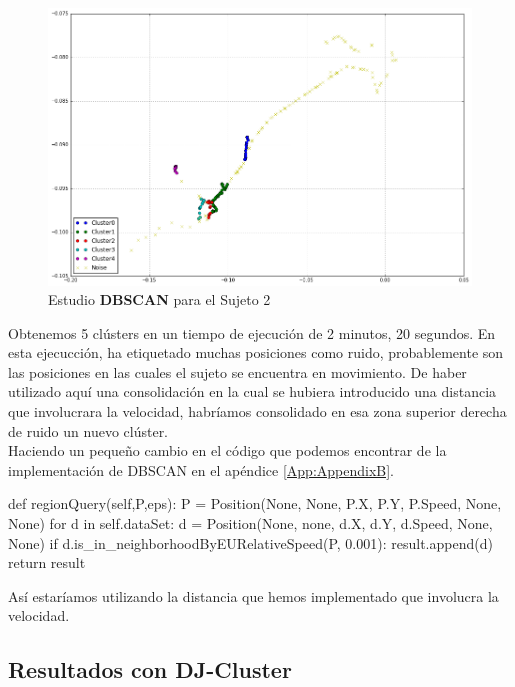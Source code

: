 \documentclass[a4paper, 12pt]{article}
\begin{document}
\begin{figure}[H]
	\includegraphics[width=15cm]{../comparativa/dbscanSujeto2.png}
	\caption{Estudio \textbf{DBSCAN} para el Sujeto 2}
\end{figure}

Obtenemos 5 cl\'usters en un tiempo de ejecuci\'on de 2 minutos, 20 segundos. En esta ejecucci\'on, ha etiquetado muchas posiciones como ruido, probablemente son las posiciones en las cuales el sujeto se encuentra en movimiento. De haber utilizado aqu\'i una consolidaci\'on en la cual se hubiera introducido una distancia que involucrara la velocidad, habr\'iamos consolidado en esa zona superior derecha de ruido un nuevo cl\'uster. \\

Haciendo un peque\~no cambio en el c\'odigo que podemos encontrar de la implementaci\'on de DBSCAN en el ap\'endice \ref{App:AppendixB}.\\

\begin{python}
def regionQuery(self,P,eps):
	P = Position(None, None, P.X, P.Y, P.Speed, None, None)
	for d in self.dataSet:
		d = Position(None, none, d.X, d.Y, d.Speed, None, None)
		if d.is_in_neighborhoodByEURelativeSpeed(P, 0.001):
			result.append(d)
	return result
\end{python}

As\'i estar\'iamos utilizando la distancia que hemos implementado que involucra la velocidad.

\subsection{Resultados con DJ-Cluster}
\end{document}
